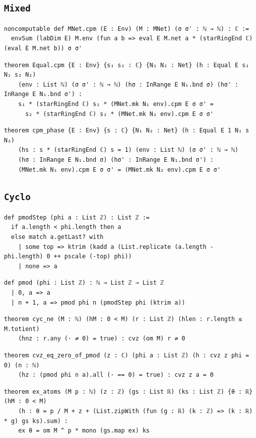 \subsection{\texttt{Mixed}}
\begin{lstlisting}[style=leancore]
noncomputable def MNet.cpm (E : Env) (M : MNet) (σ σ' : ℕ → ℕ) : ℂ :=
  envSum (labDim E) M.env (fun a b => eval E M.net a * (starRingEnd ℂ) (eval E M.net b)) σ σ'
\end{lstlisting}
\begin{lstlisting}[style=leancore]
theorem Equal.cpm {E : Env} {s₁ s₂ : ℂ} {N₁ N₂ : Net} (h : Equal E s₁ N₁ s₂ N₂)
    (env : List ℕ) (σ σ' : ℕ → ℕ) (hσ : InRange E N₁.bnd σ) (hσ' : InRange E N₁.bnd σ') :
    s₁ * (starRingEnd ℂ) s₁ * (MNet.mk N₁ env).cpm E σ σ' =
      s₂ * (starRingEnd ℂ) s₂ * (MNet.mk N₂ env).cpm E σ σ'
\end{lstlisting}
\begin{lstlisting}[style=leancore]
theorem cpm_phase {E : Env} {s : ℂ} {N₁ N₂ : Net} (h : Equal E 1 N₁ s N₂)
    (hs : s * (starRingEnd ℂ) s = 1) (env : List ℕ) (σ σ' : ℕ → ℕ)
    (hσ : InRange E N₁.bnd σ) (hσ' : InRange E N₁.bnd σ') :
    (MNet.mk N₁ env).cpm E σ σ' = (MNet.mk N₂ env).cpm E σ σ'
\end{lstlisting}

\subsection{\texttt{Cyclo}}
\begin{lstlisting}[style=leancore]
def pmodStep (phi a : List ℤ) : List ℤ :=
  if a.length < phi.length then a
  else match a.getLast? with
    | some top => ktrim (kadd a (List.replicate (a.length - phi.length) 0 ++ pscale (-top) phi))
    | none => a
\end{lstlisting}
\begin{lstlisting}[style=leancore]
def pmod (phi : List ℤ) : ℕ → List ℤ → List ℤ
  | 0, a => a
  | n + 1, a => pmod phi n (pmodStep phi (ktrim a))
\end{lstlisting}
\begin{lstlisting}[style=leancore]
theorem cyc_ne (M : ℕ) (hM : 0 < M) (r : List ℤ) (hlen : r.length ≤ M.totient)
    (hnz : r.any (· ≠ 0) = true) : cvz (om M) r ≠ 0
\end{lstlisting}
\begin{lstlisting}[style=leancore]
theorem cvz_eq_zero_of_pmod (z : ℂ) (phi a : List ℤ) (h : cvz z phi = 0) (n : ℕ)
    (hz : (pmod phi n a).all (· == 0) = true) : cvz z a = 0
\end{lstlisting}
\begin{lstlisting}[style=leancore]
theorem ex_atoms (M p : ℕ) (z : ℤ) (gs : List ℝ) (ks : List ℤ) {θ : ℝ} (hM : 0 < M)
    (h : θ = p / M + z + (List.zipWith (fun (g : ℝ) (k : ℤ) => (k : ℝ) * g) gs ks).sum) :
    ex θ = om M ^ p * mono (gs.map ex) ks
\end{lstlisting}

